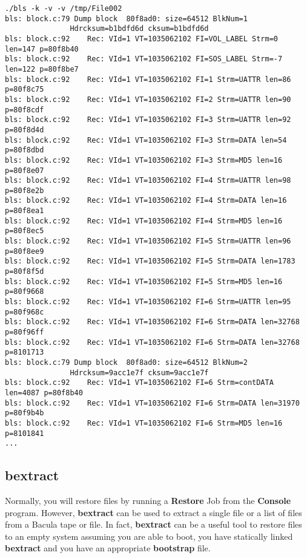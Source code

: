 \footnotesize
\begin{verbatim}
./bls -k -v -v /tmp/File002
bls: block.c:79 Dump block  80f8ad0: size=64512 BlkNum=1
               Hdrcksum=b1bdfd6d cksum=b1bdfd6d
bls: block.c:92    Rec: VId=1 VT=1035062102 FI=VOL_LABEL Strm=0 len=147 p=80f8b40
bls: block.c:92    Rec: VId=1 VT=1035062102 FI=SOS_LABEL Strm=-7 len=122 p=80f8be7
bls: block.c:92    Rec: VId=1 VT=1035062102 FI=1 Strm=UATTR len=86 p=80f8c75
bls: block.c:92    Rec: VId=1 VT=1035062102 FI=2 Strm=UATTR len=90 p=80f8cdf
bls: block.c:92    Rec: VId=1 VT=1035062102 FI=3 Strm=UATTR len=92 p=80f8d4d
bls: block.c:92    Rec: VId=1 VT=1035062102 FI=3 Strm=DATA len=54 p=80f8dbd
bls: block.c:92    Rec: VId=1 VT=1035062102 FI=3 Strm=MD5 len=16 p=80f8e07
bls: block.c:92    Rec: VId=1 VT=1035062102 FI=4 Strm=UATTR len=98 p=80f8e2b
bls: block.c:92    Rec: VId=1 VT=1035062102 FI=4 Strm=DATA len=16 p=80f8ea1
bls: block.c:92    Rec: VId=1 VT=1035062102 FI=4 Strm=MD5 len=16 p=80f8ec5
bls: block.c:92    Rec: VId=1 VT=1035062102 FI=5 Strm=UATTR len=96 p=80f8ee9
bls: block.c:92    Rec: VId=1 VT=1035062102 FI=5 Strm=DATA len=1783 p=80f8f5d
bls: block.c:92    Rec: VId=1 VT=1035062102 FI=5 Strm=MD5 len=16 p=80f9668
bls: block.c:92    Rec: VId=1 VT=1035062102 FI=6 Strm=UATTR len=95 p=80f968c
bls: block.c:92    Rec: VId=1 VT=1035062102 FI=6 Strm=DATA len=32768 p=80f96ff
bls: block.c:92    Rec: VId=1 VT=1035062102 FI=6 Strm=DATA len=32768 p=8101713
bls: block.c:79 Dump block  80f8ad0: size=64512 BlkNum=2
               Hdrcksum=9acc1e7f cksum=9acc1e7f
bls: block.c:92    Rec: VId=1 VT=1035062102 FI=6 Strm=contDATA len=4087 p=80f8b40
bls: block.c:92    Rec: VId=1 VT=1035062102 FI=6 Strm=DATA len=31970 p=80f9b4b
bls: block.c:92    Rec: VId=1 VT=1035062102 FI=6 Strm=MD5 len=16 p=8101841
...
\end{verbatim}
\normalsize

\subsection*{bextract}
\label{bextract}

Normally, you will restore files by running a {\bf Restore} Job from the {\bf
Console} program. However, {\bf bextract} can be used to extract a single file
or a list of files from a Bacula tape or file. In fact, {\bf bextract} can be
a useful tool to restore files to an empty system assuming you are able to
boot, you have statically linked {\bf bextract} and you have an appropriate
{\bf bootstrap} file. 


